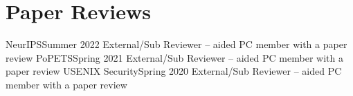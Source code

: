 \section{Paper Reviews}
\CVSubHeadingListStart
    \CVSubheading
      {NeurIPS}{Summer 2022}
      {External/Sub Reviewer -- aided PC member with a paper review}{}
    \CVSubheading
      {PoPETS}{Spring 2021}
      {External/Sub Reviewer -- aided PC member with a paper review}{}
    \CVSubheading
      {USENIX Security}{Spring 2020}
      {External/Sub Reviewer -- aided PC member with a paper review}{}
  \CVSubHeadingListEnd